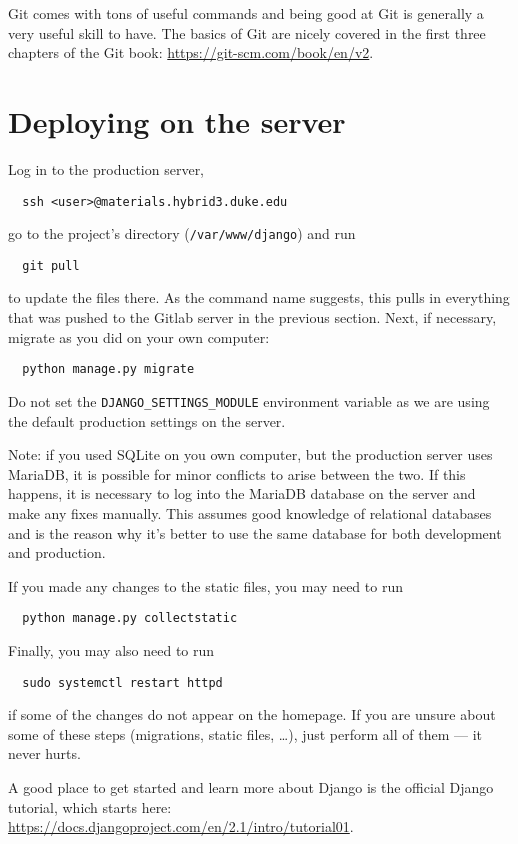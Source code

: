 \documentclass{article}
\begin{document}
Git comes with tons of useful commands and being good at Git is generally a very useful skill to have. The basics of Git are nicely covered in the first three chapters of the Git book: \url{https://git-scm.com/book/en/v2}.

\section{Deploying on the server}

Log in to the production server,
\begin{lstlisting}
  ssh <user>@materials.hybrid3.duke.edu
\end{lstlisting}
go to the project's directory (\verb+/var/www/django+) and run
\begin{lstlisting}
  git pull
\end{lstlisting}
to update the files there. As the command name suggests, this pulls in everything that was pushed to the Gitlab server in the previous section. Next,  if necessary, migrate as you did on your own computer:
\begin{lstlisting}
  python manage.py migrate
\end{lstlisting}
Do not set the \verb+DJANGO_SETTINGS_MODULE+ environment variable as we are using the default production settings on the server.

Note: if you used SQLite on you own computer, but the production server uses MariaDB, it is possible for minor conflicts to arise between the two. If this happens, it is necessary to log into the MariaDB database on the server and make any fixes manually. This assumes good knowledge of relational databases and is the reason why it's better to use the same database for both development and production.

If you made any changes to the static files, you may need to run
\begin{lstlisting}
  python manage.py collectstatic
\end{lstlisting}
Finally, you may also need to run
\begin{lstlisting}
  sudo systemctl restart httpd
\end{lstlisting}
if some of the changes do not appear on the homepage. If you are unsure about some of these steps (migrations, static files, \ldots), just perform all of them --- it never hurts.

A good place to get started and learn more about Django is the official Django tutorial, which starts here: \url{https://docs.djangoproject.com/en/2.1/intro/tutorial01}.
\end{document}
